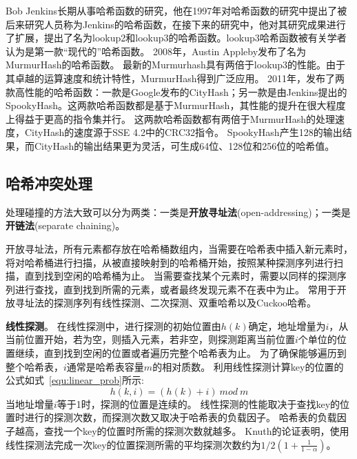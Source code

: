 Bob Jenkins长期从事哈希函数的研究，他在1997年对哈希函数的研究中提出了被后来研究人员称为Jenkins的哈希函数\cite{jenkins1997hash}，在接下来的研究中，他对其研究成果进行了扩展，提出了名为lookup2和lookup3的哈希函数\cite{jenkins2006function}。lookup3哈希函数被有关学者认为是第一款“现代的”哈希函数。
2008年，Austin Appleby发布了名为MurmurHash的哈希函数\cite{Murmurhash}。
最新的Murmurhash具有两倍于lookup3的性能。由于其卓越的运算速度和统计特性，MurmurHash得到广泛应用。
2011年，发布了两款高性能的哈希函数：一款是Google发布的CityHash\cite{cityhash}；另一款是由Jenkins提出的SpookyHash\cite{jenkins2012spookyhash}。这两款哈希函数都是基于MurmurHash，其性能的提升在很大程度上得益于更高的指令集并行。
这两款哈希函数都有两倍于MurmurHash的处理速度，CityHash的速度源于SSE 4.2中的CRC32指令。
SpookyHash产生128的输出结果，而CityHash的输出结果更为灵活，可生成64位、128位和256位的哈希值。

\subsection{哈希冲突处理}

处理碰撞的方法大致可以分为两类：一类是\textbf{开放寻址法}(open-addressing)；一类是\textbf{开链法}(separate chaining)。

开放寻址法，所有元素都存放在哈希桶数组内，当需要在哈希表中插入新元素时，将对哈希桶进行扫描，从被直接映射到的哈希桶开始，按照某种探测序列进行扫描，直到找到空闲的哈希桶为止。
当需要查找某个元素时，需要以同样的探测序列进行查找，直到找到所需的元素，或者最终发现元素不在表中为止。
常用于开放寻址法的探测序列有线性探测、二次探测、双重哈希以及Cuckoo哈希。

\textbf{线性探测}。
在线性探测中，进行探测的初始位置由$h(k)$确定，地址增量为$i$，从当前位置开始，若为空，则插入元素，若非空，则探测距离当前位置$i$个单位的位置继续，直到找到空闲的位置或者遍历完整个哈希表为止。
为了确保能够遍历到整个哈希表，$i$通常是哈希表容量$m$的相对质数。
利用线性探测计算key的位置的公式如式~\ref{equ:linear_prob}所示:
\begin{equation}
	h(k,i) = (h(k)+i) ~{mod}~m
\label{equ:linear_prob}
\end{equation}
当地址增量$i$等于1时，探测的位置是连续的。
线性探测的性能取决于查找key的位置时进行的探测次数，而探测次数又取决于哈希表的负载因子。
哈希表的负载因子越高，查找一个key的位置时所需的探测次数就越多。
Knuth的论证表明\cite{knuth1998art}，使用线性探测法完成一次key的位置探测所需的平均探测次数约为$1/2(1+\frac{1}{1-\alpha})$。


